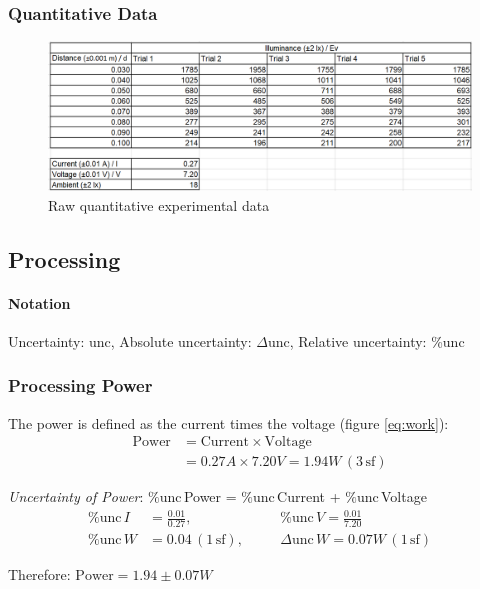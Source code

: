 \documentclass[a4paper,12pt]{article}
\newcommand{\absun}{\Delta \text{unc}\,}
\newcommand{\relun}{\% \text{unc}\,}
\newcommand{\tsf}{\,\text{sf}}
\begin{document}
\subsubsection*{Quantitative Data}
\begin{figure}[H]
    \centering
    \includegraphics[width=\textwidth]{assets/rawdata.png}
    \caption{Raw quantitative experimental data}
    \label{fig:raw}
\end{figure}

\subsection{Processing}
\paragraph{Notation}

Uncertainty: unc, Absolute uncertainty: $\Delta$unc, Relative uncertainty: \%unc


\subsubsection{Processing Power}
The power is defined as the current times the voltage (figure \ref{eq:work}):
\begin{align*}
\text{Power} &= \text{Current} \times \text{Voltage}\\
        &= 0.27\si{A} \times 7.20\si{V} = 1.94 \si{W} \,(3 \tsf)
\end{align*}

\textit{Uncertainty of Power}: $\relun$Power =  $\relun$Current +  $\relun$Voltage
\begin{alignat*}
    \relun \si{I} &= \frac{0.01}{0.27},\quad &&\relun \si{V} = \frac{0.01}{7.20}\\
    \relun \si{W} &= 0.04 \,(1 \tsf), \quad &&\absun \si{W} = 0.07\si{W} \,(1 \tsf)
\end{alignat*}

Therefore: $\text{Power} = 1.94 \pm 0.07 \si{W}$
\end{document}
